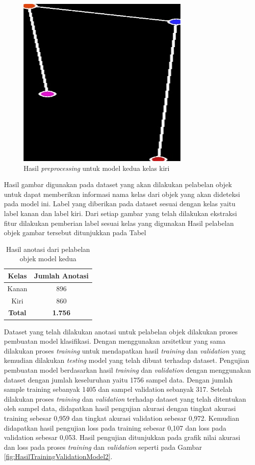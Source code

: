 \begin{figure}[H]
  \centering
  \includegraphics[scale=0.45]{gambar/dataset belakang kiri.jpg}
  \caption{Hasil \emph{preprocessing} untuk model kedua kelas kiri}
  \label{fig:KelasBelakangKiri}
\end{figure}

Hasil gambar digunakan pada dataset yang akan dilakukan pelabelan objek untuk dapat memberikan informasi nama kelas dari objek yang akan dideteksi pada model ini. Label yang diberikan pada dataset sesuai dengan kelas yaitu label kanan dan label kiri. Dari setiap gambar yang telah dilakukan ekstraksi fitur dilakukan pemberian label sesuai kelas yang digunakan Hasil pelabelan objek gambar tersebut ditunjukkan pada Tabel 

\begin{longtable}{|c|c|}
  \caption{Hasil anotasi dari pelabelan objek model kedua}
  \label{tb:HasilAnotasi}  \\
  \hline
  \rowcolor[HTML]{C0C0C0}
  \textbf{Kelas} & \textbf{Jumlah Anotasi}  \\
  \hline
  Kanan           & 896    \\
  \hline
  Kiri            & 860    \\
  \hline
  \textbf{Total}  & \textbf{1.756}  \\
  \hline
\end{longtable}

Dataset yang telah dilakukan anotasi untuk pelabelan objek dilakukan proses pembuatan model klasifikasi. Dengan menggunakan arsitetkur yang sama dilakukan proses \emph{training} untuk mendapatkan hasil \emph{training} dan \emph{validation} yang kemudian dilakukan \emph{testing} model yang telah dibuat terhadap dataset. Pengujian pembuatan model berdasarkan hasil \emph{training} dan \emph{validation} dengan menggunakan dataset dengan jumlah keseluruhan yaitu 1756 sampel data. Dengan jumlah sample training sebanyak 1405 dan sampel validation sebanyak 317. Setelah dilakukan proses \emph{training} dan \emph{validation} terhadap dataset yang telah ditentukan oleh sampel data, didapatkan hasil pengujian akurasi dengan tingkat akurasi training sebesar 0,959 dan tingkat akurasi validation sebesar 0,972. Kemudian didapatkan hasil pengujian loss pada training sebesar 0,107 dan loss pada validation sebesar 0,053. Hasil pengujian ditunjukkan pada grafik nilai akurasi dan loss pada proses \emph{training} dan \emph{validation} seperti pada Gambar \ref{fig:HasilTrainingValidationModel2}.

